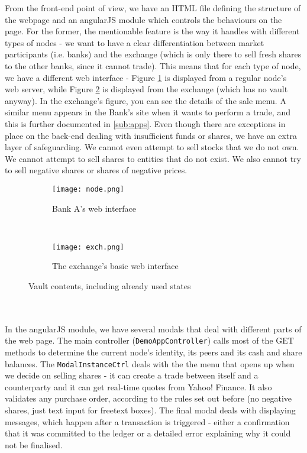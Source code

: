 \documentclass[12pt,twoside]{article}
\begin{document}

From the front-end point of view, we have an HTML file defining the structure of the webpage and an angularJS module which controls the behaviours on the page. For the former, the mentionable feature is the way it handles with different types of nodes - we want to have a clear differentiation between market participants (i.e. banks) and the exchange (which is only there to sell fresh shares to the other banks, since it cannot trade). This means that for each type of node, we have a different web interface - Figure \ref{fig:node} is displayed from a regular node's web server, while Figure \ref{fig:exch} is displayed from the exchange (which has no vault anyway). In the exchange's figure, you can see the details of the sale menu. A similar menu appears in the Bank's site when it wants to perform a trade, and this is further documented in \ref{sub:apps}. Even though there are exceptions in place on the back-end dealing with insufficient funds or shares, we have an extra layer of safeguarding. We cannot even attempt to sell stocks that we do not own. We cannot attempt to sell shares to entities that do not exist. We also cannot try to sell negative shares or shares of negative prices. 
\begin{figure}[!htb]
    \centering
    \begin{subfigure}[b]{1\textwidth}
    	\centering
        \texttt{[image: node.png]}
        \caption{Bank A's web interface}
        \label{fig:node}
    \end{subfigure}
    ~
    \begin{subfigure}[b]{0.85\textwidth}
    	\centering
        \texttt{[image: exch.png]}
        \caption{The exchange's basic web interface}
        \label{fig:exch}
    \end{subfigure}
    \caption{Vault contents, including already used states}
    \label{fig:WEBinterfaces}
\end{figure}
\\ \\
In the angularJS module, we have several modals that deal with different parts of the web page. The main controller (\verb|DemoAppController|) calls most of the GET methods to determine the current node's identity, its peers and its cash and share balances. The \verb|ModalInstanceCtrl| deals with the the menu that opens up when we decide on selling shares - it can create a trade between itself and a counterparty and it can get real-time quotes from Yahoo! Finance. It also validates any purchase order, according to the rules set out before (no negative shares, just text input for freetext boxes). The final modal deals with displaying messages, which happen after a transaction is triggered - either a confirmation that it was committed to the ledger or a detailed error explaining why it could not be finalised.
\end{document}
